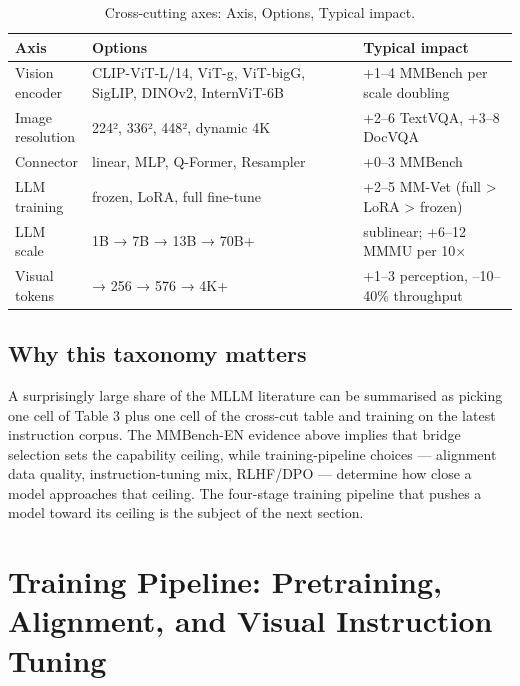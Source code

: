 \documentclass{article}
\begin{document}
\begin{table}[t]
\centering
\caption{Cross-cutting axes: Axis, Options, Typical impact.}
\label{tab:cross-cutting-axes}
\begin{tabular}{>{\raggedright\arraybackslash}p{0.1441\linewidth}
  >{\raggedright\arraybackslash}p{0.5405\linewidth}
  >{\raggedright\arraybackslash}p{0.3153\linewidth}}
\toprule
\textbf{Axis} & \textbf{Options} & \textbf{Typical impact} \\
\midrule
Vision encoder & CLIP-ViT-L/14, ViT-g, ViT-bigG, SigLIP, DINOv2, InternViT-6B & +1--4 MMBench per scale doubling \\
Image resolution & 224², 336², 448², dynamic 4K & +2--6 TextVQA, +3--8 DocVQA \\
Connector & linear, MLP, Q-Former, Resampler & +0--3 MMBench \\
LLM training & frozen, LoRA, full fine-tune & +2--5 MM-Vet (full \textgreater{} LoRA \textgreater{} frozen) \\
LLM scale & 1B → 7B → 13B → 70B+ & sublinear; +6--12 MMMU per 10× \\
Visual tokens & 32 → 256 → 576 → 4K+ & +1--3 perception, --10--40\% throughput \\
\end{tabular}
\end{table}

\subsection{Why this taxonomy matters}\label{why-this-taxonomy-matters}

A surprisingly large share of the MLLM literature can be summarised as picking one cell of Table 3 plus one cell of the cross-cut table and training on the latest instruction corpus. The MMBench-EN evidence above implies that bridge selection sets the capability ceiling, while training-pipeline choices --- alignment data quality, instruction-tuning mix, RLHF/DPO --- determine how close a model approaches that ceiling. The four-stage training pipeline that pushes a model toward its ceiling is the subject of the next section.

\section{Training Pipeline: Pretraining, Alignment, and Visual Instruction Tuning}\label{training-pipeline-pretraining-alignment-and-visual-instruction-tuning}
\end{document}
